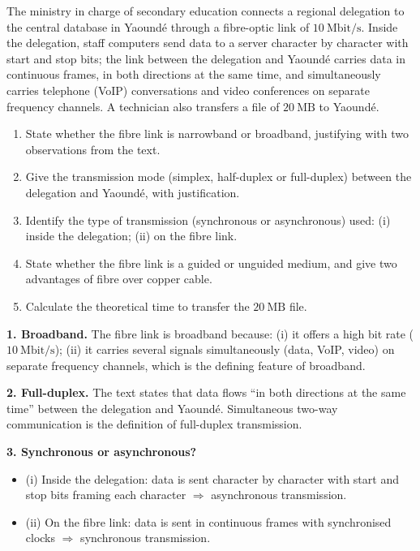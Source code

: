 \documentclass[11pt]{article}
\newcommand{\cle}[1]{{\popxbold\color{popdark}#1}}
\begin{document}
\begin{exoresolu}
The ministry in charge of secondary education connects a regional delegation to the central database in Yaound\'e through a fibre-optic link of $10\ \mathrm{Mbit/s}$. Inside the delegation, staff computers send data to a server character by character with start and stop bits; the link between the delegation and Yaound\'e carries data in continuous frames, in both directions at the same time, and simultaneously carries telephone (VoIP) conversations and video conferences on separate frequency channels. A technician also transfers a file of $20\ \mathrm{MB}$ to Yaound\'e.
\begin{enumerate}
\item State whether the fibre link is narrowband or broadband, justifying with two observations from the text.
\item Give the transmission mode (simplex, half-duplex or full-duplex) between the delegation and Yaound\'e, with justification.
\item Identify the type of transmission (synchronous or asynchronous) used: (i) inside the delegation; (ii) on the fibre link.
\item State whether the fibre link is a guided or unguided medium, and give two advantages of fibre over copper cable.
\item Calculate the theoretical time to transfer the $20\ \mathrm{MB}$ file.
\end{enumerate}
\tcblower
\textbf{1. Broadband.} The fibre link is \cle{broadband} because: (i) it offers a high bit rate ($10\ \mathrm{Mbit/s}$); (ii) it carries several signals simultaneously (data, VoIP, video) on separate frequency channels, which is the defining feature of broadband.

\textbf{2. Full-duplex.} The text states that data flows ``in both directions at the same time'' between the delegation and Yaound\'e. Simultaneous two-way communication is the definition of \cle{full-duplex} transmission.

\textbf{3. Synchronous or asynchronous?}
\begin{itemize}
\item (i) Inside the delegation: data is sent character by character with start and stop bits framing each character $\Rightarrow$ \cle{asynchronous} transmission.
\item (ii) On the fibre link: data is sent in continuous frames with synchronised clocks $\Rightarrow$ \cle{synchronous} transmission.
\end{itemize}


\end{exoresolu}
\end{document}
